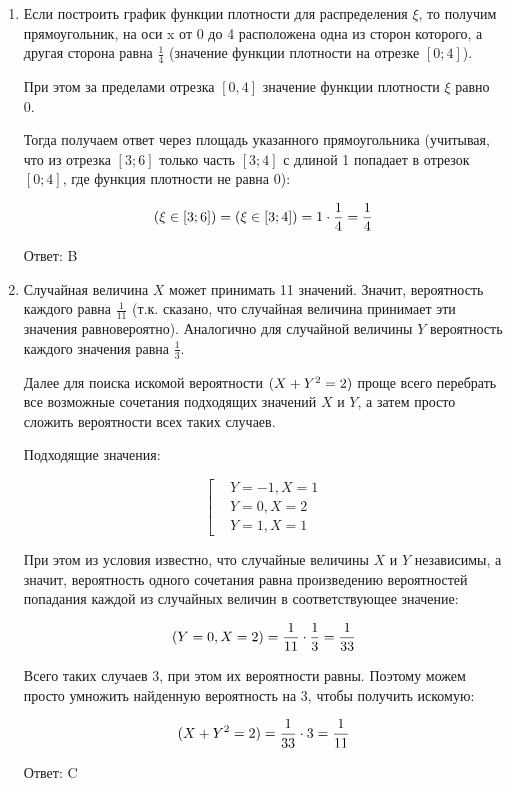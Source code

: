 \documentclass[11pt, a4paper]{article}
\let\P\relax
\DeclareMathOperator{\P}{\mathbb{P}}
\theoremstyle{definition}
\begin{document}
\begin{enumerate}
	\item 	
	
	Если построить график функции плотности для распределения $\xi$, то получим прямоугольник, на оси x от 0 до 4 расположена одна из сторон которого, а другая сторона равна $\frac{1}{4}$ (значение функции плотности на отрезке $[0;4]$). 
	
	При этом за пределами отрезка $[0,4]$ значение функции плотности $\xi$ равно 0.
	
	Тогда получаем ответ через площадь указанного прямоугольника (учитывая, что из отрезка $[3;6]$ только часть $[3;4]$ с длиной 1 попадает в отрезок $[0;4]$, где функция плотности не равна 0):
	
	\[
	\P(\xi \in [3;6])=\P(\xi \in [3;4])=1\cdot \frac{1}{4}=\frac{1}{4}
	\]
	
	Ответ: B
	
	\item 
	
	Случайная величина $X$ может принимать 11 значений. 
	Значит, вероятность каждого равна $\frac{1}{11}$ (т.к. сказано, что случайная величина принимает эти значения равновероятно). 
	Аналогично для случайной величины $Y$ вероятность каждого значения равна $\frac{1}{3}$.
	
	Далее для поиска искомой вероятности $\P(X+Y^2 = 2)$ проще всего перебрать все возможные сочетания подходящих значений $X$ и $Y$, а затем просто сложить вероятности всех таких случаев. 
	
	Подходящие значения:
	
	\[\left[
	\begin{aligned}
	&Y=-1, X=1\\
	&Y=0, X=2\\
	&Y=1, X=1
	\end{aligned}
	\right.
	\]
	
	При этом из условия известно, что случайные величины $X$ и $Y$ независимы, а значит, вероятность одного сочетания равна произведению вероятностей попадания каждой из случайных величин в соответствующее значение:
	
	\[
	\P(Y=0, X=2)=\frac{1}{11}\cdot \frac{1}{3}=\frac{1}{33}
	\]
	
	Всего таких случаев 3, при этом их вероятности равны. 
	Поэтому можем просто умножить найденную вероятность на 3, чтобы получить искомую:
	
	\[
	\P(X+Y^2 = 2) = \frac{1}{33}\cdot 3=\frac{1}{11}
	\]
	
	Ответ: C	
	

\end{enumerate}
\end{document}
